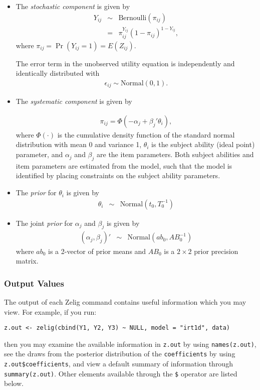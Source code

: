 \begin{itemize}
\item The \emph{stochastic component} is given by
\begin{eqnarray*}
Y_{ij}  &  \sim & \textrm{Bernoulli}(\pi_{ij}) \\
& = & \pi_{ij}^{Y_{ij}}(1-\pi_{ij})^{1-Y_{ij}},
\end{eqnarray*}
where $\pi_{ij}=\Pr(Y_{ij}=1)=E(Z_{ij})$.

The error term in the unobserved utility equation is independently
and identically distributed with 
\begin{eqnarray*}
\epsilon_{ij} \sim \textrm{Normal}(0, 1).
\end{eqnarray*}

\item The \emph{systematic component} is given by

\begin{eqnarray*}
\pi_{ij}= \Phi(-\alpha_j + \beta_j' \theta_i),
\end{eqnarray*}
where $\Phi(\cdot)$ is the cumulative density function of the standard
normal distribution with mean 0 and variance 1, $\theta_i$ is the
subject ability (ideal point) parameter, and $\alpha_j$ and $\beta_j$
are the item parameters. Both subject abilities and item parameters
are estimated from the model, such that the model is identified by
placing constraints on the subject ability parameters.

\item The \emph{prior} for $\theta_i$ is given by
\begin{eqnarray*}
\theta_i &\sim& \textrm{Normal} \left(  t_{0},T_{0}^{-1}\right)
\end{eqnarray*}

\item The joint \emph{prior} for $\alpha_j$ and $\beta_j$ is given by
\begin{eqnarray*}
(\alpha_j, \beta_j)' &\sim& \textrm{Normal}\left(  ab_{0},AB_{0}^{-1}\right)
\end{eqnarray*}
where $ab_0$ is a 2-vector of prior means and $AB_0$ is a $2 \times 2$ prior
precision matrix.

\end{itemize}
 
\subsubsection{Output Values}

The output of each Zelig command contains useful information which you may
view. For example, if you run:
\begin{verbatim}
z.out <- zelig(cbind(Y1, Y2, Y3) ~ NULL, model = "irt1d", data)
\end{verbatim}
\noindent then you may examine the available information in \texttt{z.out} by
using \texttt{names(z.out)}, see the draws from the posterior distribution of
the \texttt{coefficients} by using \texttt{z.out\$coefficients}, and view 
a default summary of information through \texttt{summary(z.out)}. 
Other elements available through the \texttt{\$} operator are listed below.

